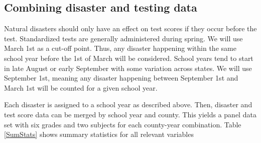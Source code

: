 \subsection{Combining disaster and testing data}

Natural disasters should only have an effect on test scores if they occur before the test. Standardized tests are generally administered during spring. We will use March 1st as a cut-off point. Thus, any disaster happening within the same school year before the 1st of March will be considered. School years tend to start in late August or early September with some variation across states. We will use September 1st, meaning any disaster happening between September 1st and March 1st will be counted for a given school year.

Each disaster is assigned to a school year as described above. Then, disaster and test score data can be merged by school year and county. This yields a panel data set with six grades and two subjects for each county-year combination. Table \ref{SumStats} shows summary statistics for all relevant variables










